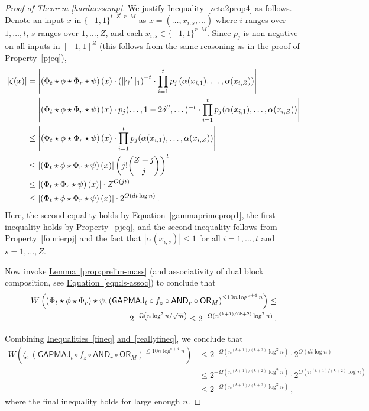 \documentclass[11pt]{article}
\numberwithin{equation}{section}
\theoremstyle{definition}
\theoremstyle{plain}
\newcommand{\expref}[2]{\hyperref[#2]{#1~\ref{#2}}}
\newcommand{\expeqref}[2]{\hyperref[#2]{#1~\eqref{#2}}}
\newcommand{\OR}{\mathsf{ OR}}
\newcommand{\GAPMAJ}{\mathsf{GAPMAJ}}
\newcommand{\bits}{\{-1,1\}}
\newcommand{\ls}{\star}
\newcommand{\AND}{\mathsf{AND}}
\begin{document}
\begin{proof}[Proof of Theorem \ref{hardnessamp}]
	We justify \expeqref{Inequality}{zeta2prop4} as follows. Denote
	an input $x$ in $\bits^{t \cdot Z \cdot r \cdot M}$ as $x=(\dots, x_{i, s}, \dots)$ 
	where $i$ ranges over $1, \dots, t$, $s$ ranges over $1, \dots, Z$,
	and each $x_{i,s} \in \bits^{r \cdot M}$.  Since $p_j$ is non-negative on all inputs in $[-1, 1]^Z$ (this follows from the same reasoning as in the proof of \expeqref{Property}{pjeq}),
	\begin{align}
	\left|\zeta(x)\right| &= \left|\left(\Phi_t \ls \phi \ls \Phi_r \ls \psi\right)(x) \cdot \left(\|\gamma'\|_1\right)^{-t}  \cdot \prod_{i=1}^{t} p_j\left(\alpha(x_{i, 1}), \dots, \alpha(x_{i, Z})\right) \right| \notag \\
	\notag &=  \left|\left(\Phi_t \ls \phi \ls \Phi_r \ls \psi\right)(x) \cdot p_j(\dots, 1-2\delta'', \dots)^{-t} \cdot \prod_{i=1}^{t} p_j(\alpha(x_{i, 1}), \dots, \alpha(x_{i, Z}))\right|\\
	\notag &\leq  \left|\left(\Phi_t \ls \phi \ls \Phi_r \ls \psi\right)(x) \cdot \prod_{i=1}^{t} p_j(\alpha(x_{i, 1}), \dots, \alpha(x_{i, Z}))\right|\\
	&\leq \left| \left(\Phi_t \ls \phi \ls \Phi_r \ls \psi\right)(x) \right| \left(j! {Z+j \choose j}\right)^t \notag \\
	&\leq \left| \left(\Phi_t \ls \Phi_r \ls \psi\right)(x) \right| \cdot Z^{O(jt)} \notag\\
	&\leq 
	\left| \left(\Phi_t \ls \phi \ls \Phi_r \ls \psi\right)(x) \right| \cdot 2^{O(d t \log n)}\,. \label{fineq} 
	\end{align}
	Here, the second equality holds by \expeqref{Equation}{gammaprimeprop1}, the first inequality holds by \expeqref{Property}{pjeq}, and the second inequality follows from \expeqref{Property}{fourierpj} and the fact that $|\alpha(x_{i, s})| \leq 1$ for all $i=1, \dots, t$ and $s=1, \dots, Z$. 
	
	Now invoke \expref{Lemma}{prop:prelim-mass} (and associativity of dual block composition, see 
	 \expeqref{Equation}{eqn:ls-assoc}) to conclude that 
	\begin{align} \label{reallyfineq} W\left( \left(\Phi_t \ls \phi \ls \Phi_r\right) \ls \psi, \left(\GAPMAJ_t \circ f_z \circ \AND_r \circ \OR_M\right)^{\leq 10 n \log^{c+4} n}\right) \notag \leq\\
	2^{-\Omega\left(n \log^2 n / \sqrt{m}\right)} \leq 2^{-\Omega(n^{(k+1)/(k+2)} \log^2 n)}\,.\end{align}
	
	Combining \expeqref{Inequalities}{fineq} \expeqref{and}{reallyfineq}, we conclude that
	\begin{align*} W\left( \zeta, \left(\GAPMAJ_t \circ f_z \circ \AND_r \circ \OR_M\right)^{\leq 10 n \log^{c+4} n}\right) &
	\leq 2^{-\Omega\left(n^{(k+1)/(k+2)} \log^2 n\right)} \cdot 2^{O\left(d t \log n\right)} \\
	&\leq 2^{-\Omega\left(n^{(k+1)/(k+2)} \log^2 n\right)} \cdot 2^{O\left(n^{(k+1)/(k+2)} \log n\right)}\\
	&\leq 2^{-\Omega\left(n^{(k+1)/(k+2)} \log^2 n\right)}\,,
	\end{align*}
	where the final inequality holds for large enough $n$. 
	

\end{proof}
\end{document}
